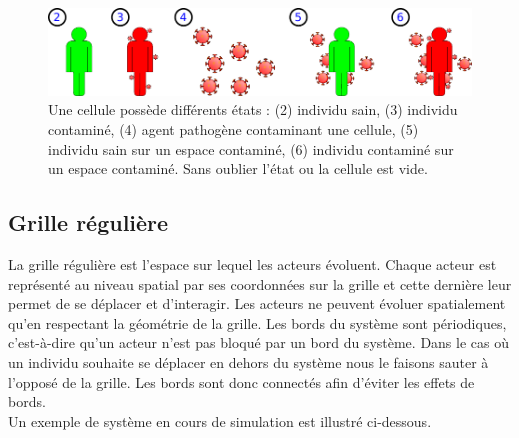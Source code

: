 \begin{figure}[h]
	\centering
	\captionsetup{justification=centering}
	\includegraphics[scale=0.7]{Images/cell_states.pdf}
	\caption[Différents états de la cellule]{Une cellule possède différents états : (2) individu sain, (3) individu contaminé, (4) agent pathogène contaminant une cellule, (5) individu sain sur un espace contaminé, (6) individu contaminé sur un espace contaminé. Sans oublier l'état ou la cellule est vide.  }
\end{figure}

\newpage

\subsection{Grille régulière}

La grille régulière est l'espace sur lequel les acteurs évoluent. Chaque acteur est représenté au niveau spatial par ses coordonnées sur la grille et cette dernière leur permet de se déplacer et d'interagir. Les acteurs ne peuvent évoluer spatialement qu'en respectant la géométrie de la grille. Les bords du système sont périodiques, c'est-à-dire qu'un acteur n'est pas bloqué par un bord du système. Dans le cas où un individu souhaite se déplacer en dehors du système nous le faisons sauter à l'opposé de la grille. Les bords sont donc connectés afin d'éviter les effets de bords. \\

Un exemple de système en cours de simulation est illustré ci-dessous.

